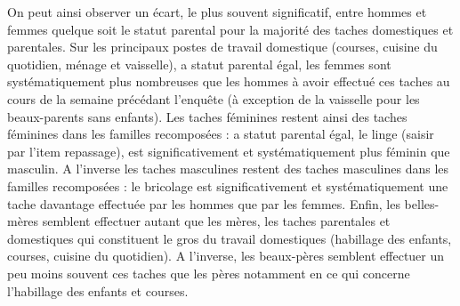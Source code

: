 \documentclass[
  12pt,
]{book}
\begin{document}
On peut ainsi observer un écart, le plus souvent significatif, entre
hommes et femmes quelque soit le statut parental pour la majorité des
taches domestiques et parentales. Sur les principaux postes de travail
domestique (courses, cuisine du quotidien, ménage et vaisselle), a
statut parental égal, les femmes sont systématiquement plus nombreuses
que les hommes à avoir effectué ces taches au cours de la semaine
précédant l'enquête (à exception de la vaisselle pour les beaux-parents
sans enfants). Les taches féminines restent ainsi des taches féminines
dans les familles recomposées : a statut parental égal, le linge (saisir
par l'item repassage), est significativement et systématiquement plus
féminin que masculin. A l'inverse les taches masculines restent des
taches masculines dans les familles recomposées : le bricolage est
significativement et systématiquement une tache davantage effectuée par
les hommes que par les femmes. Enfin, les belles-mères semblent
effectuer autant que les mères, les taches parentales et domestiques qui
constituent le gros du travail domestiques (habillage des enfants,
courses, cuisine du quotidien). A l'inverse, les beaux-pères semblent
effectuer un peu moins souvent ces taches que les pères notamment en ce
qui concerne l'habillage des enfants et courses.
\end{document}
